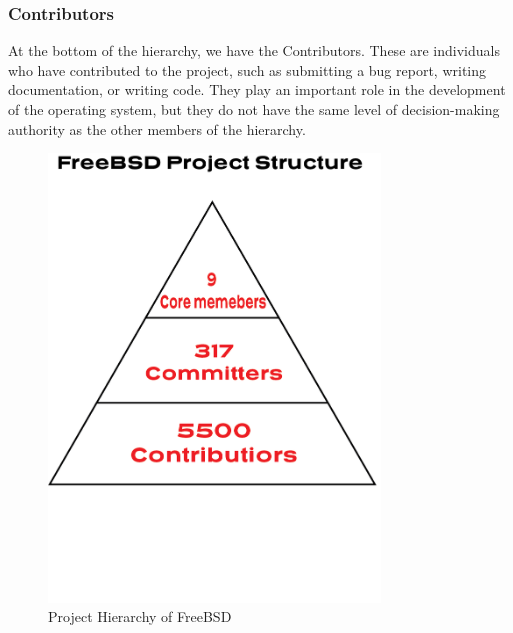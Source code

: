 \documentclass[12pt, dvipsnames, a4paper]{article}
\begin{document}
\subsubsection{Contributors}
At the bottom of the hierarchy, we have the Contributors. These are individuals who have contributed to the project, such as submitting a bug report, writing documentation, or writing code. They play an important role in the development of the operating system, but they do not have the same level of decision-making authority as the other members of the hierarchy.
\begin{figure}[!htb]
	\centering
	\includegraphics[width = 250pt]{assets/other_diagrams/Project-Structure.png}
	\caption{Project Hierarchy of FreeBSD \cite{dev-model}}
\end{figure}
\end{document}
